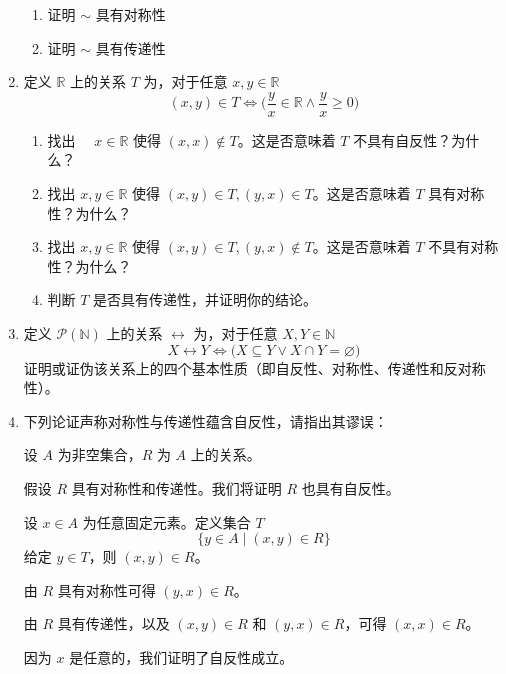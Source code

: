 \begin{enumerate}[label=(\arabic*)]
\begin{enumerate}[label=(\alph*)]
        \item 证明 $\sim$ 具有对称性
        \item 证明 $\sim$ 具有传递性
    \end{enumerate} \label{exc:exercises6.2.3}
    \item 定义 $\mathbb{R}$ 上的关系 $T$ 为，对于任意 $x, y \in \mathbb{R}$
    \[(x, y) \in T \iff \Big(\frac{y}{x} \in \mathbb{R} \land \frac{y}{x} \ge 0\Big)\]
    \begin{enumerate}[label=(\alph*)]
        \item 找出 $\quad x \in \mathbb{R}$ 使得 $(x,x) \notin T$。这是否意味着 $T$ 不具有自反性？为什么？
        \item 找出 $x,y \in \mathbb{R}$ 使得 $(x,y) \in T, (y,x) \in T$。这是否意味着 $T$ 具有对称性？为什么？
        \item 找出 $x,y \in \mathbb{R}$ 使得 $(x,y) \in T, (y,x) \notin T$。这是否意味着 $T$ 不具有对称性？为什么？
        \item 判断 $T$ 是否具有传递性，并证明你的结论。
    \end{enumerate}
    \item 定义 $\mathcal{P}(\mathbb{N})$ 上的关系 $\leftrightarrow$ 为，对于任意 $X, Y \in \mathbb{N}$
    \[X \leftrightarrow Y \iff \Big(X \subseteq Y \lor X \cap Y = \varnothing \Big)\]
    证明或证伪该关系上的四个基本性质（即自反性、对称性、传递性和反对称性）。
    \item 下列论证声称对称性与传递性蕴含自反性，请指出其谬误：
    \begin{center}
        \noindent
            \parbox{0.85\textwidth}{%
                \linespread{1.5}\selectfont
                设 $A$ 为非空集合，$R$ 为 $A$ 上的关系。

                假设 $R$ 具有对称性和传递性。我们将证明 $R$ 也具有自反性。

                设 $x \in A$ 为任意固定元素。定义集合 $T$
                \[\{y \in A \mid (x, y) \in R\}\]
                给定 $y \in T$，则 $(x, y) \in R$。

                由 $R$ 具有对称性可得 $(y,x) \in R$。

                由 $R$ 具有传递性，以及 $(x, y) \in R$ 和 $(y, x) \in R$，可得 $(x,x) \in R$。

                因为 $x$ 是任意的，我们证明了自反性成立。 
            }
    \end{center}
\end{enumerate}
